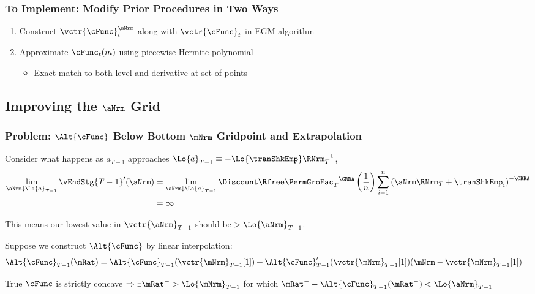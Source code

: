 \documentclass{beamer}
\begin{document}
\begin{frame}
\frametitle{To Implement: Modify Prior Procedures in Two Ways}
\begin{enumerate}
\item Construct $\vctr{\cFunc}^{\mNrm}_{t}$ along with $\vctr{\cFunc}_{t}$ in EGM algorithm
\item Approximate $\cFunc_{t}(m)$ using piecewise Hermite polynomial
\begin{itemize}
\item Exact match to both level and derivative at set of points
\end{itemize}
\end{enumerate}
\end{frame}


\subsection{Improving the $\aNrm$ Grid}

\begin{frame}
\frametitle{Problem: $\Alt{\cFunc}$ Below Bottom $\mNrm$ Gridpoint and Extrapolation}

Consider what happens as $a_{T-1}$ approaches $\Lo{a}_{T-1}\equiv-\Lo{\tranShkEmp}\RNrm_{T}^{-1}$,
\begin{equation*}\begin{gathered}\begin{aligned}
        \lim_{{\aNrm} \downarrow \Lo{a}_{T-1}} \vEndStg{T-1}^{\prime}(\aNrm) 
& =         \lim_{{\aNrm} \downarrow \Lo{a}_{T-1}} \Discount \Rfree \PermGroFac_{T}^{-\CRRA} \left(\frac{1}{n}\right) \sum_{i=1}^{n} \left(  \aNrm\RNrm_{T}+ \tranShkEmp_{i}\right)^{-\CRRA}
\\  & = \infty
\end{aligned}\end{gathered}\end{equation*}

This means our lowest value in $\vctr{\aNrm}_{T-1}$ should be $> \Lo{\aNrm}_{T-1}$.  

\medskip
Suppose we construct $\Alt{\cFunc}$ by linear interpolation:
\begin{equation*}\begin{gathered}\begin{aligned}
  \Alt{\cFunc}_{T-1}(\mRat)  & = \Alt{\cFunc}_{T-1}(\vctr{\mNrm}_{T-1}[1])+\Alt{\cFunc}_{T-1}^{\prime}(\vctr{\mNrm}_{T-1}[1])(\mNrm-\vctr{\mNrm}_{T-1}[1]) \label{eq:ExtrapLin}
\end{aligned}\end{gathered}\end{equation*}

True $\cFunc$ is strictly concave 
$\Rightarrow \exists \mRat^{-} > \Lo{\mNrm}_{T-1}$  for which $\mRat^{-}-\Alt{\cFunc}_{T-1}(\mRat^{-}) < \Lo{\aNrm}_{T-1}$

\end{frame}
\end{document}
